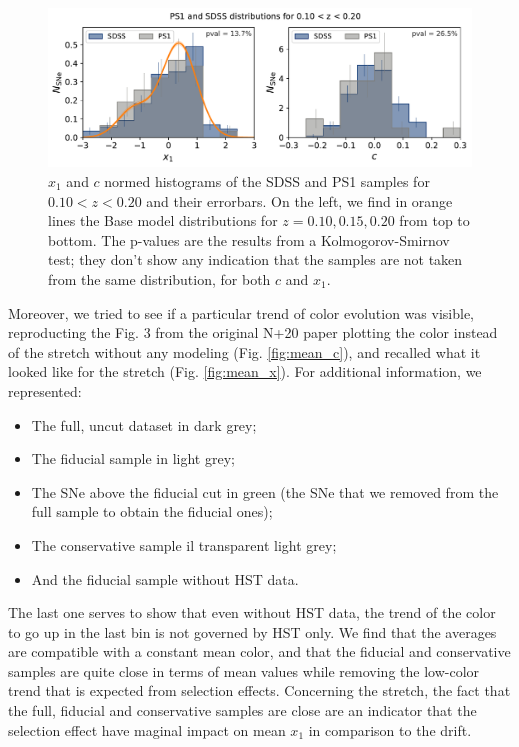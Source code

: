 \documentclass[11pt,a4paper]{paper}
\begin{document}
\begin{figure}[htbp!]
    \centering
    \includegraphics[width=\linewidth]{Answer_figures/both-cut_SDSS_PS1-010-020.pdf}
    \captionsetup{justification=centering}
    \caption{$x_1$ and $c$ normed histograms of the SDSS and PS1 samples for
        $0.10 < z < 0.20$ and their errorbars. On the left, we find in orange
        lines the Base model distributions for $z = 0.10, 0.15, 0.20$ from top
        to bottom. The p-values are the results from a Kolmogorov-Smirnov test;
    they don't show any indication that the samples are not taken from the same
distribution, for both $c$ and $x_1$.}
\label{fig:distrib}
\end{figure}

Moreover, we tried to see if a particular trend of color evolution was visible,
reproducting the Fig. 3 from the original N+20 paper plotting the color instead
of the stretch without any modeling (Fig. \ref{fig:mean_c}), and recalled what
it looked like for the stretch (Fig. \ref{fig:mean_x}). For additional
information, we represented:
\begin{itemize}
    \item The full, uncut dataset in dark grey;
    \item The fiducial sample in light grey;
    \item The SNe above the fiducial cut in green (the SNe that we removed from
        the full sample to obtain the fiducial ones);
    \item The conservative sample il transparent light grey;
    \item And the fiducial sample without HST data.
\end{itemize}
The last one serves to show that even without HST data, the trend of the color
to go up in the last bin is not governed by HST only. We find that the averages
are compatible with a constant mean color, and that the fiducial and
conservative samples are quite close in terms of mean values while removing the
low-color trend that is expected from selection effects. Concerning the stretch,
the fact that the full, fiducial and conservative samples are close are an
indicator that the selection effect have maginal impact on mean $x_1$ in
comparison to the drift.
\end{document}
